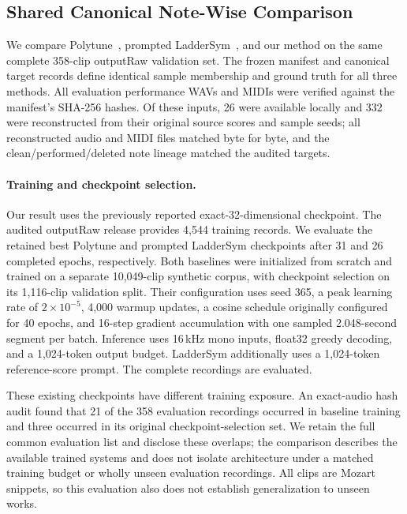 \subsection{Shared Canonical Note-Wise Comparison}

We compare Polytune~\citep{chou2025polytune}, prompted
LadderSym~\citep{chou2026laddersym}, and our method on the same complete
358-clip outputRaw validation set. The frozen manifest and canonical target
records define identical sample membership and ground truth for all three
methods. All evaluation performance WAVs and MIDIs were verified against the
manifest's SHA-256 hashes. Of these inputs, 26 were available locally and
332 were reconstructed from their original source scores and sample seeds;
all reconstructed audio and MIDI files matched byte for byte, and the
clean/performed/deleted note lineage matched the audited targets.

\paragraph{Training and checkpoint selection.}
Our result uses the previously reported exact-32-dimensional checkpoint.
The audited outputRaw release provides 4,544 training records. We evaluate the
retained best Polytune and prompted LadderSym checkpoints after 31 and 26
completed epochs, respectively. Both baselines were initialized from scratch
and trained on a separate 10,049-clip synthetic corpus, with checkpoint
selection on its 1,116-clip validation split. Their configuration uses seed
365, a peak learning rate of $2\times10^{-5}$, 4,000 warmup updates, a cosine
schedule originally configured for 40 epochs, and 16-step gradient
accumulation with one sampled 2.048-second segment per batch. Inference uses
16\,kHz mono inputs, float32 greedy decoding, and a 1,024-token output budget.
LadderSym additionally uses a 1,024-token reference-score prompt. The complete
recordings are evaluated.

These existing checkpoints have different training exposure. An exact-audio
hash audit found that 21 of the 358 evaluation recordings occurred in baseline
training and three occurred in its original checkpoint-selection set. We
retain the full common evaluation list and disclose these overlaps; the
comparison describes the available trained systems and does not isolate
architecture under a matched training budget or wholly unseen evaluation
recordings. All clips are Mozart snippets, so this evaluation also does not
establish generalization to unseen works.

